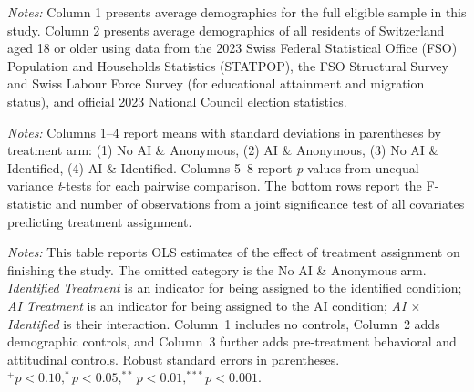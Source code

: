 \documentclass[12pt,notitlepage]{article}
\theoremstyle{plain}
\theoremstyle{plain}
\theoremstyle{definition}
\theoremstyle{definition}
\theoremstyle{assumption}
\theoremstyle{plain}
\theoremstyle{plain}
\theoremstyle{plain}
\theoremstyle{plain}
\theoremstyle{definition}%
\theoremstyle{plain}
\theoremstyle{plain}
\theoremstyle{plain}
\theoremstyle{plain}
\begin{document}
\begin{table}[H]
\caption{Sample Demographics}
\label{tab:summary_stat}
\centering
\scalebox{0.9}{}


\vspace{0.5em}
\begin{minipage}{0.9\textwidth}
\footnotesize
\raggedright
\textit{Notes:} Column 1 presents average demographics for the full eligible sample in this study. 
Column 2 presents average demographics of all residents of Switzerland aged 18 or older using 
data from the 2023 Swiss Federal Statistical Office (FSO) Population and Households Statistics 
(STATPOP), the FSO Structural Survey and Swiss Labour Force Survey (for educational attainment 
and migration status), and official 2023 National Council election statistics.
\end{minipage}


\end{table}

\begin{table}[htbp]
    \caption{Summary Statistics and Balance Tests}
    \label{tab:balance}
    \centering
    \resizebox{\textwidth}{!}{}
    \begin{minipage}{\textwidth}
        \footnotesize\medskip
        \textit{Notes:} Columns 1--4 report means with standard deviations
        in parentheses by treatment arm: (1) No AI \& Anonymous,
        (2) AI \& Anonymous, (3) No AI \& Identified, (4) AI \& Identified.
        Columns 5--8 report \textit{p}-values from unequal-variance
        \textit{t}-tests for each pairwise comparison. The bottom rows
        report the F-statistic and number of observations from a joint
        significance test of all covariates predicting treatment assignment.
    \end{minipage}
\end{table}




\begin{table}[htbp]
\caption{Treatment Effects on Finishing Study}
\label{tab:treat_effect}
\centering

\scalebox{0.58}{}

\vspace{0.5em}
\begin{minipage}{\textwidth}
\footnotesize
\raggedright
\textit{Notes:} This table reports OLS estimates of the effect of
    treatment assignment on finishing the study.
    The omitted category is the No AI \& Anonymous arm.
    \textit{Identified Treatment} is an indicator for being assigned
    to the identified condition; \textit{AI Treatment} is an indicator
    for being assigned to the AI condition;
    \textit{AI $\times$ Identified} is their interaction.
    Column~1 includes no controls, Column~2 adds demographic controls, and Column~3 further adds
    pre-treatment behavioral and attitudinal controls. Robust standard errors in parentheses.
    $^{+} p<0.10, ^{*} p<0.05, ^{**} p<0.01, ^{***} p<0.001$.
\end{minipage}

\end{table}
\end{document}
